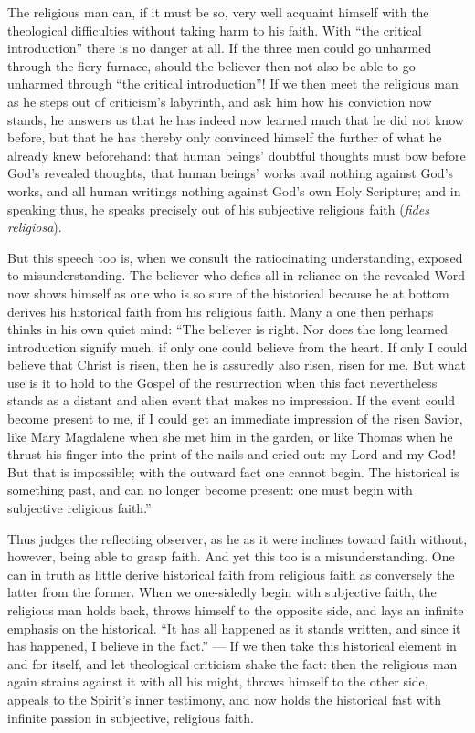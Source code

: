 \documentclass[12pt,a4paper]{book}
\begin{document}
The religious man can, if it must be so, very well acquaint himself with the
theological difficulties without taking harm to his faith. With ``the critical
introduction'' there is no danger at all. If the three men could go unharmed
through the fiery furnace, should the believer then not also be able to go
unharmed through ``the critical introduction''! If we then meet the religious
man as he steps out of criticism's labyrinth, and ask him how his conviction now
stands, he answers us that he has indeed now learned much that he did not know
before, but that he has thereby only convinced himself the further of what he
already knew beforehand: that human beings' doubtful thoughts must bow before
God's revealed thoughts, that human beings' works avail nothing against God's
works, and all human writings nothing against God's own Holy Scripture; and in
speaking thus, he speaks precisely out of his subjective religious faith
(\textit{fides religiosa}).

But this speech too is, when we consult the ratiocinating understanding, exposed
to misunderstanding. The believer who defies all in reliance on the revealed
Word now shows himself as one who is so sure of the historical because he at
bottom derives his historical faith from his religious faith. Many a one then
perhaps thinks in his own quiet mind: ``The believer is right. Nor does the long
learned introduction signify much, if only one could believe from the heart. If
only I could believe that Christ is risen, then he is assuredly also risen,
risen for me. But what use is it to hold to the Gospel of the resurrection when
this fact nevertheless stands as a distant and alien event that makes no
impression. If the event could become present to me, if I could get an immediate
impression of
the risen Savior, like Mary Magdalene when she met him in the garden, or like
Thomas when he thrust his finger into the print of the nails and cried out: my
Lord and my God! But that is impossible; with the outward fact one cannot begin.
The historical is something past, and can no longer become present: one must
begin with subjective religious faith.''

Thus judges the reflecting observer, as he as it were inclines toward faith
without, however, being able to grasp faith. And yet this too is a
misunderstanding. One can in truth as little derive historical faith from
religious faith as conversely the latter from the former. When we one-sidedly
begin with subjective faith, the religious man holds back, throws himself to the
opposite side, and lays an infinite emphasis on the historical. ``It has all
happened as it stands written, and since it has happened, I believe in the
fact.'' --- If we then take this historical element in and for itself, and let
theological criticism shake the fact: then the religious man again strains
against it with all his might, throws himself to the other side, appeals to the
Spirit's inner testimony, and now holds the historical fast with infinite
passion in subjective, religious faith.
\end{document}

